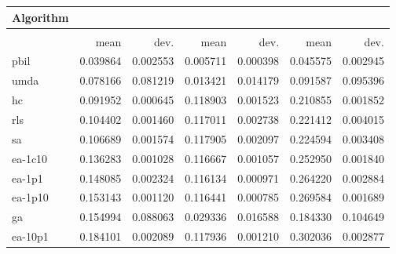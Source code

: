 \begin{tabular}{@{} l *{6}{>{{}}N{1}{2}} @{}}
\toprule
{Algorithm} &  \\
\midrule
&  &  &  \\
\midrule
& {mean} & {dev.} & {mean} & {dev.} & {mean} & {dev.} \\
\midrule
pbil & 0.039864 & 0.002553 & 0.005711 & 0.000398 & 0.045575 & 0.002945 \\
umda & 0.078166 & 0.081219 & 0.013421 & 0.014179 & 0.091587 & 0.095396 \\
hc & 0.091952 & 0.000645 & 0.118903 & 0.001523 & 0.210855 & 0.001852 \\
rls & 0.104402 & 0.001460 & 0.117011 & 0.002738 & 0.221412 & 0.004015 \\
sa & 0.106689 & 0.001574 & 0.117905 & 0.002097 & 0.224594 & 0.003408 \\
ea-1c10 & 0.136283 & 0.001028 & 0.116667 & 0.001057 & 0.252950 & 0.001840 \\
ea-1p1 & 0.148085 & 0.002324 & 0.116134 & 0.000971 & 0.264220 & 0.002884 \\
ea-1p10 & 0.153143 & 0.001120 & 0.116441 & 0.000785 & 0.269584 & 0.001689 \\
ga & 0.154994 & 0.088063 & 0.029336 & 0.016588 & 0.184330 & 0.104649 \\
ea-10p1 & 0.184101 & 0.002089 & 0.117936 & 0.001210 & 0.302036 & 0.002877 \\
\bottomrule
\end{tabular}
